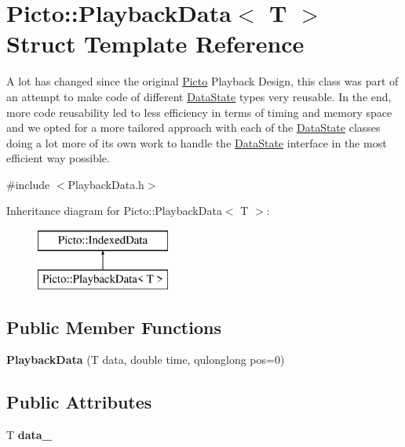 \hypertarget{struct_picto_1_1_playback_data}{\section{Picto\-:\-:Playback\-Data$<$ T $>$ Struct Template Reference}
\label{struct_picto_1_1_playback_data}
}


A lot has changed since the original \hyperlink{namespace_picto}{Picto} Playback Design, this class was part of an attempt to make code of different \hyperlink{class_picto_1_1_data_state}{Data\-State} types very reusable. In the end, more code reusability led to less efficiency in terms of timing and memory space and we opted for a more tailored approach with each of the \hyperlink{class_picto_1_1_data_state}{Data\-State} classes doing a lot more of its own work to handle the \hyperlink{class_picto_1_1_data_state}{Data\-State} interface in the most efficient way possible.  




{\ttfamily \#include $<$Playback\-Data.\-h$>$}

Inheritance diagram for Picto\-:\-:Playback\-Data$<$ T $>$\-:\begin{figure}[H]
\begin{center}
\leavevmode
\includegraphics[height=2.000000cm]{struct_picto_1_1_playback_data}
\end{center}
\end{figure}
\subsection*{Public Member Functions}
\begin{DoxyCompactItemize}
\item 
\hypertarget{struct_picto_1_1_playback_data_af19ca57f6925f42625a0aba0f941af4c}{{\bfseries Playback\-Data} (T data, double time, qulonglong pos=0)}\label{struct_picto_1_1_playback_data_af19ca57f6925f42625a0aba0f941af4c}

\end{DoxyCompactItemize}
\subsection*{Public Attributes}
\begin{DoxyCompactItemize}
\item 
\hypertarget{struct_picto_1_1_playback_data_ababde7d2092c24314dc7a3d58b45fc36}{T {\bfseries data\-\_\-}}\label{struct_picto_1_1_playback_data_ababde7d2092c24314dc7a3d58b45fc36}

\end{DoxyCompactItemize}


